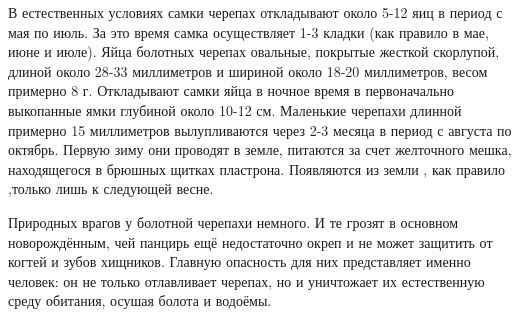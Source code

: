 В естественных условиях самки черепах откладывают около 5-12 яиц в период с мая по июль. За это время самка осуществляет 1-3 кладки (как правило в мае, июне и июле). Яйца болотных черепах овальные, покрытые жесткой скорлупой, длиной около 28-33 миллиметров и шириной около 18-20 миллиметров, весом примерно 8 г. Откладывают самки яйца в ночное время в первоначально выкопанные ямки глубиной около 10-12 см. Маленькие черепахи длинной примерно 15 миллиметров вылупливаются через 2-3 месяца в период с августа по октябрь. Первую зиму они проводят в земле, питаются за счет желточного мешка, находящегося в брюшных щитках пластрона. Появляются из земли , как правило ,только лишь к следующей весне.

Природных врагов у болотной черепахи немного. И те грозят в основном новорождённым, чей панцирь ещё недостаточно окреп и не может защитить от когтей и зубов хищников. Главную опасность для них представляет именно человек: он не только отлавливает черепах, но и уничтожает их естественную среду обитания, осушая болота и водоёмы.





















